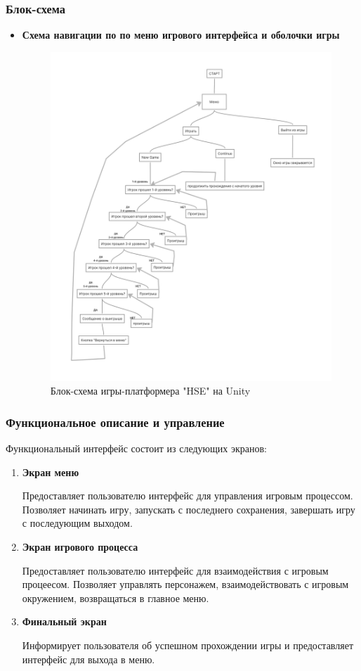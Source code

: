 \documentclass{article}
\begin{document}
\subsubsection{Блок-схема}
    \begin{itemize}
    \item \textbf{Схема навигации по по меню игрового интерфейса и оболочки игры} \\
   \begin{figure}[h]
    \centering
    \includegraphics[width=1.0\linewidth]{схема.png}
    \caption{Блок-схема игры-платформера "HSE" на Unity}
    \label{fig:mpr}
    \end{figure}
    \end{itemize}
\subsubsection{Функциональное описание и управление}
    Функциональный интерфейс состоит из следующих экранов:
    \begin{enumerate}
  \item \textbf{Экран меню} \par
      Предоставляет пользователю интерфейс для управления игровым процессом. Позволяет начинать игру, запускать с последнего сохранения, завершать игру с последующим выходом.
  \item \textbf{Экран игрового процесса} \par
      Предоставляет пользователю интерфейс для взаимодействия с игровым процеесом. Позволяет управлять персонажем, взаимодействовать с игровым окружением, возвращаться в главное меню.
  \item \textbf{Финальный экран}\par
      Информирует пользователя об успешном прохождении игры и предоставляет интерфейс для выхода в меню.
    \end{enumerate}
\end{document}
